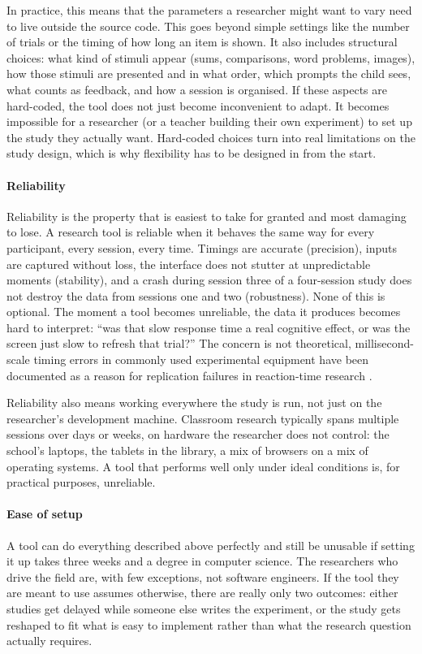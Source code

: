 In practice, this means that the parameters a researcher might want to vary need to live outside the source code. This goes beyond simple settings like the number of trials or the timing of how long an item is shown. It also includes structural choices: what kind of stimuli appear (sums, comparisons, word problems, images), how those stimuli are presented and in what order, which prompts the child sees, what counts as feedback, and how a session is organised. If these aspects are hard-coded, the tool does not just become inconvenient to adapt. It becomes impossible for a researcher (or a teacher building their own experiment) to set up the study they actually want. Hard-coded choices turn into real limitations on the study design, which is why flexibility has to be designed in from the start.

\paragraph{Reliability}
Reliability is the property that is easiest to take for granted and most damaging to lose. A research tool is reliable when it behaves the same way for every participant, every session, every time. Timings are accurate (precision), inputs are captured without loss, the interface does not stutter at unpredictable moments (stability), and a crash during session three of a four-session study does not destroy the data from sessions one and two (robustness). None of this is optional. The moment a tool becomes unreliable, the data it produces becomes hard to interpret: ``was that slow response time a real cognitive effect, or was the screen just slow to refresh that trial?'' The concern is not theoretical, millisecond-scale timing errors in commonly used experimental equipment have been documented as a reason for replication failures in reaction-time research \cite{plant2013millisecond}.

Reliability also means working everywhere the study is run, not just on the researcher's development machine. Classroom research typically spans multiple sessions over days or weeks, on hardware the researcher does not control: the school's laptops, the tablets in the library, a mix of browsers on a mix of operating systems. A tool that performs well only under ideal conditions is, for practical purposes, unreliable.

\paragraph{Ease of setup}
A tool can do everything described above perfectly and still be unusable if setting it up takes three weeks and a degree in computer science. The researchers who drive the field are, with few exceptions, not software engineers. If the tool they are meant to use assumes otherwise, there are really only two outcomes: either studies get delayed while someone else writes the experiment, or the study gets reshaped to fit what is easy to implement rather than what the research question actually requires.

